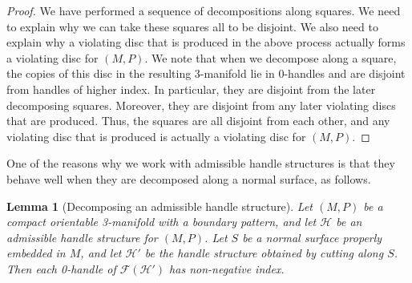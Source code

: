 \documentclass[oneside]{amsart}
\numberwithin{equation}{section}
\theoremstyle{plain}
\newtheorem{lemma}[equation]{Lemma}
\theoremstyle{definition}
\begin{document}
\begin{proof}
We have performed a sequence of decompositions along squares. We need to explain why we can take these squares all to be disjoint. We also need to explain why a violating disc that is produced in the above process actually forms a violating disc for $(M,P)$. We note that when we decompose along a square, the copies of this disc in the resulting 3-manifold lie in 0-handles and are disjoint from handles of higher index. In particular, they are disjoint from the later decomposing squares. Moreover, they are disjoint from any later violating discs that are produced. Thus, the squares are all disjoint from each other, and any violating disc that is produced is actually a violating disc for $(M,P)$.

\end{proof}

One of the reasons why we work with admissible handle structures is that they behave well when they are decomposed along a normal surface, as follows.

\begin{lemma}[Decomposing an admissible handle structure]
\label{Lem:AdmissibleDecomposition}
Let $(M,P)$ be a compact orientable 3-manifold with a boundary pattern, and let $\mathcal{H}$ be an admissible handle structure for $(M,P)$. Let $S$ be a normal surface properly embedded in $M$, and let $\mathcal{H}'$ be the handle structure obtained by cutting along $S$. Then each 0-handle of $\mathcal{F}(\mathcal{H}')$ has non-negative index.
\end{lemma}
\end{document}

